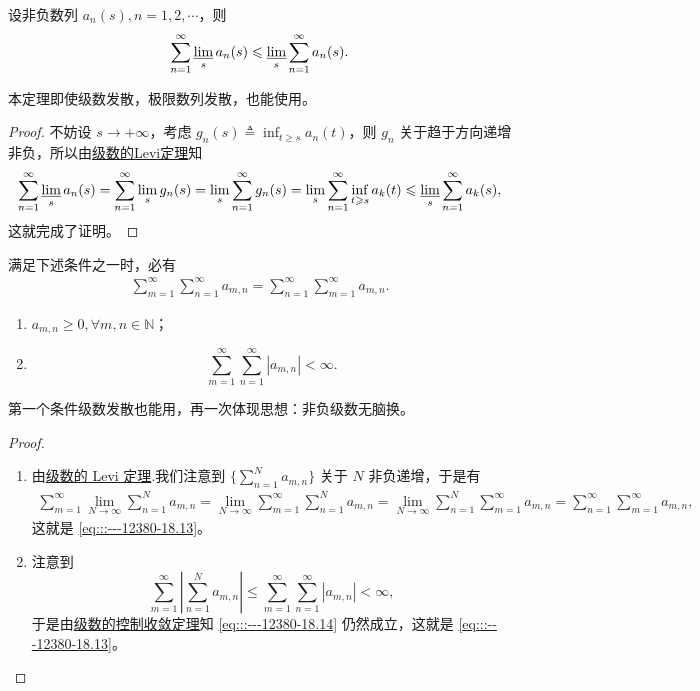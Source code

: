 \documentclass[../../main.tex]{subfiles}
\begin{document}
\begin{lemma}[级数的Fatou引理]\label{lemma:级数的Fatou引理}
设非负数列 \( a_n(s), n = 1, 2, \cdots \)，则
\[
\sum_{n = 1}^{\infty} \varliminf_{s} a_n(s) \leqslant \varliminf_{s} \sum_{n = 1}^{\infty} a_n(s).
\]
\end{lemma}
\begin{note}
本定理即使级数发散，极限数列发散，也能使用。
\end{note}
\begin{proof}
不妨设 \( s \to +\infty \)，考虑 \( g_n(s) \triangleq \inf_{t \geqslant s} a_n(t) \)，则 \( g_n \) 关于趋于方向递增非负，所以由\hyperref[theorem:级数的Levi定理]{级数的Levi定理}知
\[
\sum_{n = 1}^{\infty} \varliminf_{s} a_n(s) = \sum_{n = 1}^{\infty} \lim_{s} g_n(s) = \lim_{s} \sum_{n = 1}^{\infty} g_n(s) = \lim_{s} \sum_{n = 1}^{\infty} \inf_{t \geqslant s} a_k(t) \leqslant \varliminf_{s} \sum_{n = 1}^{\infty} a_k(s),
\]
这就完成了证明。
\end{proof}

\begin{theorem}[级数的Fubini定理]\label{theorem:级数的Fubini定理}
满足下述条件之一时，必有
\begin{align}
\sum_{m = 1}^{\infty} \sum_{n = 1}^{\infty} a_{m,n} = \sum_{n = 1}^{\infty} \sum_{m = 1}^{\infty} a_{m,n}. \label{eq:::---12380-18.13}
\end{align}
\begin{enumerate}
\item \( a_{m,n} \geqslant 0, 
\forall m, n \in \mathbb{N} \)；

\item \[
\sum_{m = 1}^{\infty} \sum_{n = 1}^{\infty} |a_{m,n}| < \infty.
\]
\end{enumerate}
\end{theorem}
\begin{note}
第一个条件级数发散也能用，再一次体现思想：非负级数无脑换。
\end{note}
\begin{proof}
\begin{enumerate}
\item 由\hyperref[theorem:级数的Levi定理]{级数的 Levi 定理}.我们注意到 \( \{\sum_{n = 1}^{N} a_{m,n} \}\) 关于 \( N \) 非负递增，于是有
\begin{align}
\sum_{m = 1}^{\infty} \lim_{N \to \infty} \sum_{n = 1}^{N} a_{m,n} = \lim_{N \to \infty} \sum_{m = 1}^{\infty} \sum_{n = 1}^{N} a_{m,n} = \lim_{N \to \infty} \sum_{n = 1}^{N} \sum_{m = 1}^{\infty} a_{m,n} = \sum_{n = 1}^{\infty} \sum_{m = 1}^{\infty} a_{m,n}, \label{eq:::---12380-18.14}
\end{align}
这就是 \eqref{eq:::---12380-18.13}。

\item 注意到
\[
\sum_{m = 1}^{\infty} \left| \sum_{n = 1}^{N} a_{m,n} \right| \leqslant \sum_{m = 1}^{\infty} \sum_{n = 1}^{\infty} |a_{m,n}| < \infty,
\]
于是由\hyperref[theorem:级数的控制收敛定理]{级数的控制收敛定理}知 \eqref{eq:::---12380-18.14} 仍然成立，这就是 \eqref{eq:::---12380-18.13}。
\end{enumerate}
\end{proof}
\end{document}
